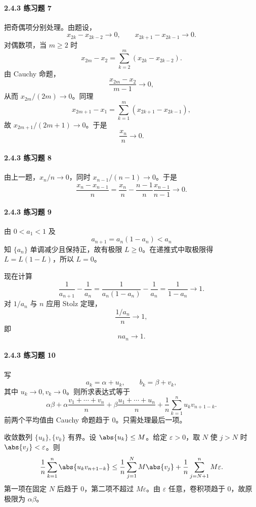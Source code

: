 \paragraph{2.4.3 练习题 7}
\begin{xsolution}
把奇偶项分别处理。由题设，
\[
  x_{2k}-x_{2k-2}\to0,
  \qquad
  x_{2k+1}-x_{2k-1}\to0.
\]
对偶数项，当 $m\ge2$ 时
\[
  x_{2m}-x_2=\sum_{k=2}^m(x_{2k}-x_{2k-2}).
\]
由 Cauchy 命题，
\[
  \frac{x_{2m}-x_2}{m-1}\to0,
\]
从而 $x_{2m}/(2m)\to0$。同理
\[
  x_{2m+1}-x_1=\sum_{k=1}^m(x_{2k+1}-x_{2k-1}),
\]
故 $x_{2m+1}/(2m+1)\to0$。于是
\[
  \boxed{\frac{x_n}{n}\to0}.
\]
\end{xsolution}

\paragraph{2.4.3 练习题 8}
\begin{xsolution}
由上一题，$x_n/n\to0$，同时 $x_{n-1}/(n-1)\to0$。于是
\[
  \frac{x_n-x_{n-1}}n
  =\frac{x_n}{n}-\frac{n-1}{n}\frac{x_{n-1}}{n-1}\to0.
\]
\end{xsolution}

\paragraph{2.4.3 练习题 9}
\begin{xsolution}
由 $0<a_1<1$ 及
\[
  a_{n+1}=a_n(1-a_n)<a_n
\]
知 $\{a_n\}$ 单调减少且保持正，故有极限 $L\ge0$。在递推式中取极限得 $L=L(1-L)$，所以 $L=0$。

现在计算
\[
  \frac1{a_{n+1}}-\frac1{a_n}
  =\frac1{a_n(1-a_n)}-\frac1{a_n}
  =\frac1{1-a_n}\to1.
\]
对 $1/a_n$ 与 $n$ 应用 Stolz 定理，
\[
  \frac{1/a_n}{n}\to1,
\]
即
\[
  \boxed{na_n\to1}.
\]
\end{xsolution}

\paragraph{2.4.3 练习题 10}
\begin{xsolution}
写
\[
  a_k=\alpha+u_k,\qquad b_k=\beta+v_k,
\]
其中 $u_k\to0,v_k\to0$。则所求表达式等于
\[
  \alpha\beta
  +\alpha\frac{v_1+\cdots+v_n}{n}
  +\beta\frac{u_1+\cdots+u_n}{n}
  +\frac1n\sum_{k=1}^n u_kv_{n+1-k}.
\]
前两个平均值由 Cauchy 命题趋于 $0$。只需处理最后一项。

收敛数列 $\{u_k\},\{v_k\}$ 有界。设 $\abs{u_k}\le M$。给定 $\varepsilon>0$，取 $N$ 使 $j>N$ 时 $\abs{v_j}<\varepsilon$。则
\[
  \frac1n\sum_{k=1}^n\abs{u_kv_{n+1-k}}
  \le \frac1n\sum_{j=1}^N M\abs{v_j}
     +\frac1n\sum_{j=N+1}^n M\varepsilon.
\]
第一项在固定 $N$ 后趋于 $0$，第二项不超过 $M\varepsilon$。由 $\varepsilon$ 任意，卷积项趋于 $0$，故原极限为 $\alpha\beta$。
\end{xsolution}

